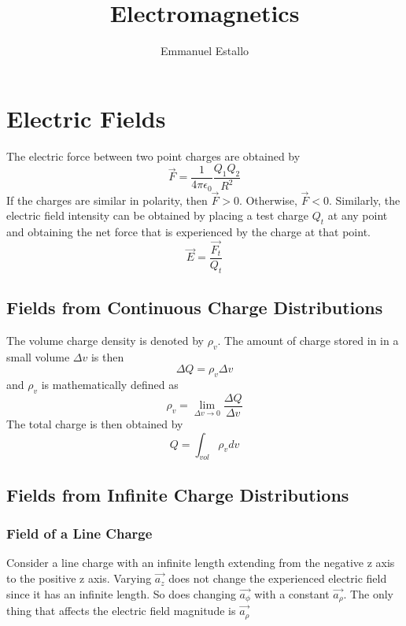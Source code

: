 \documentclass{article}
\title{Electromagnetics}
\author{Emmanuel Estallo}
\begin{document}
\maketitle 
 
\section{Electric Fields}
\noindent 
The electric force between two point charges are obtained by 
$$\vec{F} = \frac{1}{4\pi\epsilon_0}\frac{Q_1 Q_2}{R^2}$$
If the charges are similar in polarity, then $\vec{F}> 0$. Otherwise, 
$\vec{F} < 0$.
Similarly, the electric field intensity can be obtained by placing a test charge $Q_t$ 
at any point and obtaining the net force that is experienced by the charge at that point.
$$\vec{E} = \frac{\vec{F_t}}{Q_t}$$

\subsection{Fields from Continuous Charge Distributions}
The volume charge density is denoted by $\rho_v$. The amount of charge stored in 
in a small volume $\Delta{v}$ is then $$\Delta{Q} = \rho_v \Delta{v}$$ and $\rho_v$
is mathematically defined as $$\rho_v = \lim_{\Delta{v}\to 0} 
\frac{\Delta{Q}}{\Delta{v}}$$ The total charge is then obtained by 
$$Q = \int_{vol} \rho_v dv$$

\subsection{Fields from Infinite Charge Distributions}
\subsubsection{Field of a Line Charge}
\noindent 
Consider a line charge with an infinite length extending from the negative z axis 
to the positive z axis. Varying $\vec{a_z}$ does not change the 
experienced electric field since it has an infinite length. So does changing 
$\vec{a_\phi}$ with a constant $\vec{a_\rho}$. The only thing that affects the
electric field magnitude is $\vec{a_\rho}$ 
\end{document}
